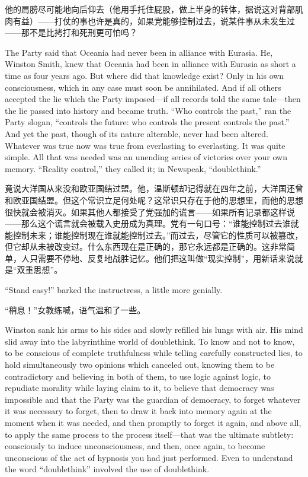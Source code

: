 \begin{paracol}{2}
\switchcolumn

他的肩膀尽可能地向后仰去（他用手托住屁股，做上半身的转体，据说这对背部肌肉有益）——打仗的事也许是真的，如果党能够控制过去，说某件事从未发生过——那不是比拷打和死刑更可怕吗？

\switchcolumn*

The Party said that Oceania had never been in alliance with Eurasia. He,
Winston Smith, knew that Oceania had been in alliance with Eurasia as
short a time as four years ago. But where did that knowledge exist? Only
in his own consciousness, which in any case must soon be annihilated.
And if all others accepted the lie which the Party imposed---if all
records told the same tale---then the lie passed into history and became
truth. ``Who controls the past,'' ran the Party slogan, ``controls the
future: who controls the present controls the past.'' And yet the past,
though of its nature alterable, never had been altered. Whatever was
true now was true from everlasting to everlasting. It was quite simple.
All that was needed was an unending series of victories over your own
memory. ``Reality control,'' they called it; in Newspeak, ``doublethink.''

\switchcolumn

竟说大洋国从来没和欧亚国结过盟。他，温斯顿却记得就在四年之前，大洋国还曾和欧亚国结盟。但这个常识立足何处呢？这常识只存在于他的思想里，而他的思想很快就会被消灭。如果其他人都接受了党强加的谎言——如果所有记录都这样说——那么这个谎言就会被载入史册成为真理。党有一句口号：``谁能控制过去谁就能控制未来；谁能控制现在谁就能控制过去。''而过去，尽管它的性质可以被篡改，但它却从未被改变过。什么东西现在是正确的，那它永远都是正确的。这非常简单，人只需要不停地、反复地战胜记忆。他们把这叫做``现实控制''，用新话来说就是``双重思想''。

\switchcolumn*

``Stand easy!'' barked the instructress, a little more genially.

\switchcolumn

``稍息！''女教练喊，语气温和了一些。

\switchcolumn*

Winston sank his arms to his sides and slowly refilled his lungs with
air. His mind slid away into the labyrinthine world of doublethink. To
know and not to know, to be conscious of complete truthfulness while
telling carefully constructed lies, to hold simultaneously two opinions
which canceled out, knowing them to be contradictory and believing in
both of them, to use logic against logic, to repudiate morality while
laying claim to it, to believe that democracy was impossible and that
the Party was the guardian of democracy, to forget whatever it was
necessary to forget, then to draw it back into memory again at the
moment when it was needed, and then promptly to forget it again, and
above all, to apply the same process to the process itself---that was
the ultimate subtlety: consciously to induce unconsciousness, and then,
once again, to become unconscious of the act of hypnosis you had just
performed. Even to understand the word ``doublethink'' involved the use of
doublethink.


\end{paracol}
